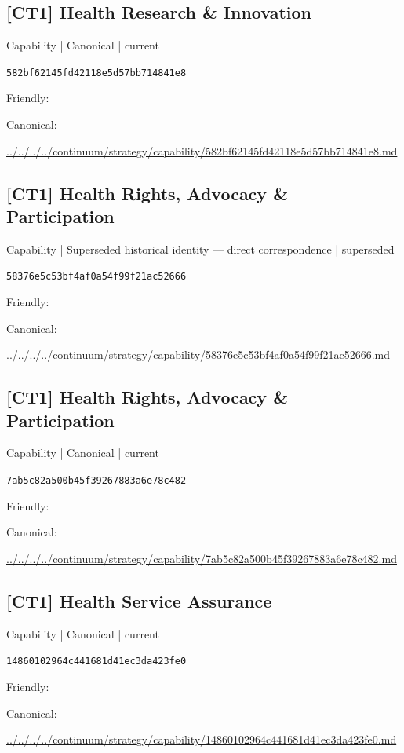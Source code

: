 \documentclass[10pt,a4paper]{article}
\begin{document}
\subsection*{[CT1] Health Research \& Innovation}
{\small Capability | Canonical | current}\par
\texttt{582bf62145fd42118e5d57bb714841e8}\par
Friendly: \par
Canonical: \par
{\footnotesize\url{../../../../continuum/strategy/capability/582bf62145fd42118e5d57bb714841e8.md}}\par
\subsection*{[CT1] Health Rights, Advocacy \& Participation}
{\small Capability | Superseded historical identity — direct correspondence | superseded}\par
\texttt{58376e5c53bf4af0a54f99f21ac52666}\par
Friendly: \par
Canonical: \par
{\footnotesize\url{../../../../continuum/strategy/capability/58376e5c53bf4af0a54f99f21ac52666.md}}\par
\subsection*{[CT1] Health Rights, Advocacy \& Participation}
{\small Capability | Canonical | current}\par
\texttt{7ab5c82a500b45f39267883a6e78c482}\par
Friendly: \par
Canonical: \par
{\footnotesize\url{../../../../continuum/strategy/capability/7ab5c82a500b45f39267883a6e78c482.md}}\par
\subsection*{[CT1] Health Service Assurance}
{\small Capability | Canonical | current}\par
\texttt{14860102964c441681d41ec3da423fe0}\par
Friendly: \par
Canonical: \par
{\footnotesize\url{../../../../continuum/strategy/capability/14860102964c441681d41ec3da423fe0.md}}\par
\end{document}

